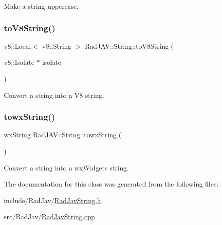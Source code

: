 Make a string uppercase. 

\mbox{\label{class_rad_j_a_v_1_1_string_a643c90b7e35b74db4fc800c877f1ac60}} 
\subsubsection{\texorpdfstring{to\+V8\+String()}{toV8String()}}
{\footnotesize\ttfamily v8\+::\+Local$<$ v8\+::\+String $>$ Rad\+J\+A\+V\+::\+String\+::to\+V8\+String (\begin{DoxyParamCaption}\item[{v8\+::\+Isolate $\ast$}]{isolate }\end{DoxyParamCaption})}



Convert a string into a V8 string. 

\mbox{\label{class_rad_j_a_v_1_1_string_a97887990d083861ef56140b7f53dbe7a}} 
\subsubsection{\texorpdfstring{towx\+String()}{towxString()}}
{\footnotesize\ttfamily wx\+String Rad\+J\+A\+V\+::\+String\+::towx\+String (\begin{DoxyParamCaption}{ }\end{DoxyParamCaption})}



Convert a string into a wx\+Widgets string. 



The documentation for this class was generated from the following files\+:\begin{DoxyCompactItemize}
\item 
include/\+Rad\+Jav/\mbox{\hyperlink{_rad_jav_string_8h}{Rad\+Jav\+String.\+h}}\item 
src/\+Rad\+Jav/\mbox{\hyperlink{_rad_jav_string_8cpp}{Rad\+Jav\+String.\+cpp}}\end{DoxyCompactItemize}
